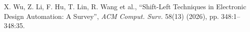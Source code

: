 X. Wu, Z. Li, F. Hu, T. Lin, R. Wang et al.,
``Shift-Left Techniques in Electronic Design Automation: A Survey'',
{\em ACM Comput. Surv.} 58(13) (2026), pp. 348:1--348:35.
